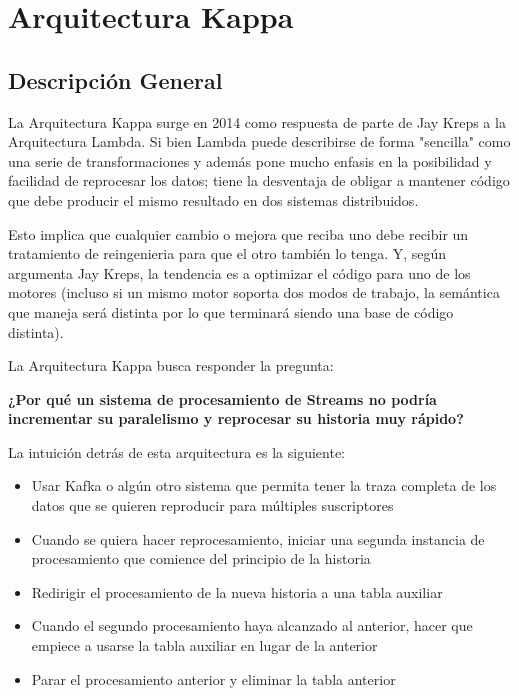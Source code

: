 \section{Arquitectura Kappa}

\subsection{Descripción General}

La Arquitectura Kappa surge en 2014 como respuesta de parte de Jay Kreps a la Arquitectura Lambda. 
Si bien Lambda puede describirse de forma "sencilla" como una serie de transformaciones y además pone 
mucho enfasis en la posibilidad y facilidad de reprocesar los datos; 
tiene la desventaja de obligar a mantener código que debe producir el mismo resultado en dos sistemas
distribuidos. \newline 

Esto implica que cualquier cambio o mejora que reciba uno debe recibir un tratamiento
de reingenieria para que el otro también lo tenga. Y, según argumenta Jay Kreps, la tendencia es a 
optimizar el código para uno de los motores (incluso si un mismo motor soporta dos modos de trabajo, 
la semántica que maneja será distinta por lo que terminará siendo una base de código distinta). \parencite{kreps2014questioning}\newline

La Arquitectura Kappa busca responder la pregunta: \newline

\textbf{¿Por qué un sistema de procesamiento de Streams no podría incrementar su paralelismo y reprocesar su historia muy rápido?}   
\newline

La intuición detrás de esta arquitectura es la siguiente: 

\begin{itemize}
    \item Usar Kafka o algún otro sistema que permita tener la traza completa de los datos que se quieren reproducir para múltiples suscriptores
    \item Cuando se quiera hacer reprocesamiento, iniciar una segunda instancia de procesamiento que comience del principio de la historia
    \item Redirigir el procesamiento de la nueva historia a una tabla auxiliar
    \item Cuando el segundo procesamiento haya alcanzado al anterior, hacer que empiece a usarse la tabla auxiliar en lugar de la anterior
    \item Parar el procesamiento anterior y eliminar la tabla anterior
\end{itemize}

